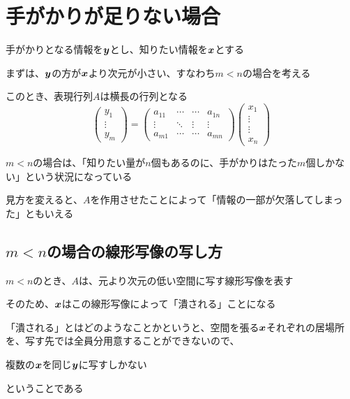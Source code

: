 \documentclass[../../../topic_linear-algebra]{subfiles}
\begin{document}
\sectionline
\section{手がかりが足りない場合}

手がかりとなる情報を$\vb*{y}$とし、知りたい情報を$\vb*{x}$とする

\br

まずは、$\vb*{y}$の方が$\vb*{x}$より次元が小さい、すなわち$m < n$の場合を考える

このとき、表現行列$A$は横長の行列となる
\begin{equation*}
  \begin{pmatrix}
    y_1    \\
    \vdots \\
    y_m
  \end{pmatrix} = \begin{pmatrix}
    a_{11} & \cdots & \cdots & a_{1n} \\
    \vdots & \ddots & \vdots & \vdots \\
    a_{m1} & \cdots & \cdots & a_{mn}
  \end{pmatrix} \begin{pmatrix}
    x_1    \\
    \vdots \\
    \vdots \\
    x_n
  \end{pmatrix}
\end{equation*}

$m < n$の場合は、「知りたい量が$n$個もあるのに、手がかりはたった$m$個しかない」という状況になっている

\br

見方を変えると、$A$を作用させたことによって「情報の一部が欠落してしまった」ともいえる

\subsection{$m < n$の場合の線形写像の写し方}

$m < n$のとき、$A$は、元より次元の低い空間に写す線形写像を表す

そのため、$\vb*{x}$はこの線形写像によって「潰される」ことになる

\br

「潰される」とはどのようなことかというと、空間を張る$\vb*{x}$それぞれの居場所を、写す先では全員分用意することができないので、
\begin{shaded}
  複数の$\vb*{x}$を同じ$\vb*{y}$に写すしかない
\end{shaded}
ということである
\end{document}
